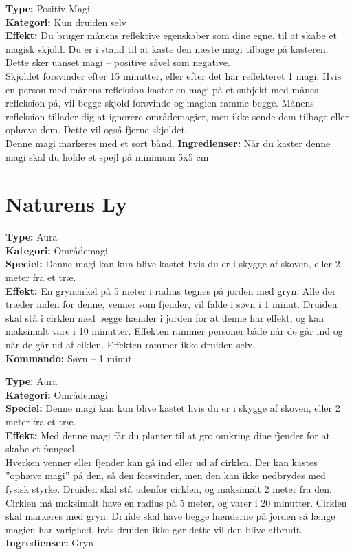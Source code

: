 \begin{nBeskyt*}
\textbf{Type:} Positiv Magi\\ 
\textbf{Kategori:} Kun druiden selv\\
\textbf{Effekt:} Du bruger månens reflektive egenskaber som dine egne, til at skabe et magisk skjold. Du er i stand til at kaste den næste magi tilbage på kasteren. Dette sker uanset magi – positive såvel som negative.\\
Skjoldet forsvinder efter 15 minutter, eller efter det har reflekteret 1 magi. Hvis en person med månens refleksion kaster en magi på et subjekt med månes refleksion på, vil begge skjold forsvinde og magien ramme begge. Månens refleksion tillader dig at ignorere områdemagier, men ikke sende dem tilbage
eller ophæve dem. Dette vil også fjerne skjoldet.\\
Denne magi markeres med et sort bånd.
\textbf{Ingredienser:} Når du kaster denne magi skal du holde et spejl på minimum 5x5 cm
\end{nBeskyt*}

\section{Naturens Ly}

\begin{nly*}
\textbf{Type:} Aura \\
\textbf{Kategori:} Områdemagi\\
\textbf{Speciel:} Denne magi kan kun blive kastet hvis du er i skygge af skoven, eller 2 meter fra et træ.\\
\textbf{Effekt:} En gryncirkel på 5 meter i radius tegnes på jorden med gryn. Alle der træder inden for denne, venner som fjender, vil falde i søvn i 1 minut. Druiden skal stå i cirklen med begge hænder i jorden for at denne har effekt, og kan maksimalt vare i 10 minutter. Effekten rammer personer både når de går ind og når de går ud af ciklen. Effekten rammer ikke druiden selv.\\
\textbf{Kommando:} Søvn – 1 minut
\end{nly*}

\begin{nly*}
\textbf{Type:} Aura \\
\textbf{Kategori:} Områdemagi\\
\textbf{Speciel:} Denne magi kan kun blive kastet hvis du er i skygge af skoven, eller 2 meter fra et træ.\\
\textbf{Effekt:} Med denne magi får du planter til at gro omkring dine fjender for at skabe et fængsel.\\ 
Hverken venner eller fjender kan gå ind eller ud af cirklen. Der kan kastes ”ophæve magi” på den, så den forsvinder, men den kan ikke nedbrydes med fysisk styrke. Druiden skal stå udenfor cirklen, og maksimalt 2 meter fra den. Cirklen må maksimalt have en radius på 5 meter, og varer i 20 minutter. Cirklen skal
markeres med gryn. Druide skal have begge hænderne på jorden så længe magien har varighed, hvis druiden ikke gør dette vil den blive afbrudt.\\
\textbf{Ingredienser:} Gryn
\end{nly*}

